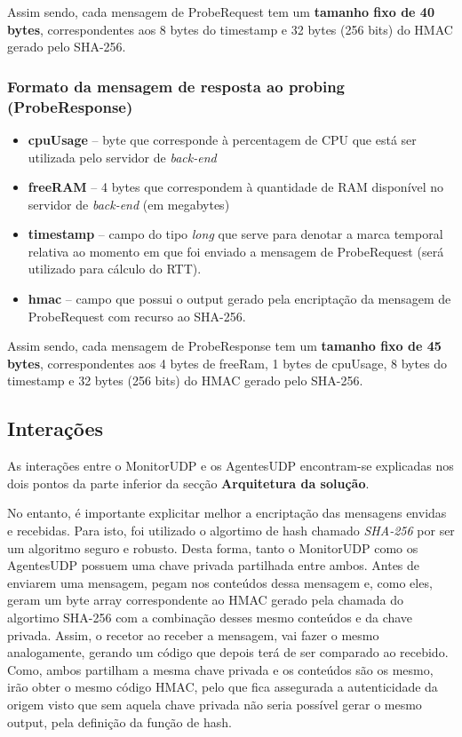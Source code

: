 \documentclass{article}
\begin{document}
Assim sendo, cada mensagem de ProbeRequest tem um \textbf{tamanho fixo de 40 bytes}, correspondentes aos 8 bytes do timestamp e 32 bytes (256 bits) do HMAC gerado pelo SHA-256.

\subsubsection{Formato da mensagem de resposta ao probing (ProbeResponse)}

\begin{itemize}
    \item \textbf{cpuUsage} -- byte que corresponde à percentagem de CPU que está ser utilizada pelo servidor de \emph{back-end}
    \item \textbf{freeRAM} -- 4 bytes que correspondem à quantidade de RAM disponível no servidor de \emph{back-end} (em megabytes)
    \item \textbf{timestamp} -- campo do tipo \emph{long} que serve para denotar a marca temporal relativa ao momento em que foi enviado a mensagem de ProbeRequest (será utilizado para cálculo do RTT).
    \item \textbf{hmac} -- campo que possui o output gerado pela encriptação da mensagem de ProbeRequest com recurso ao SHA-256.
\end{itemize}

Assim sendo, cada mensagem de ProbeResponse tem um \textbf{tamanho fixo de 45 bytes}, correspondentes aos 4 bytes de freeRam, 1 bytes de cpuUsage, 8 bytes do timestamp e 32 bytes (256 bits) do HMAC gerado pelo SHA-256.

\subsection{Interações}

As interações entre o MonitorUDP e os AgentesUDP encontram-se explicadas nos dois pontos da parte inferior da secção \textbf{Arquitetura da solução}.

No entanto, é importante explicitar melhor a encriptação das mensagens envidas e recebidas. Para isto, foi utilizado o algortimo de hash chamado \emph{SHA-256} por ser um algoritmo seguro e robusto. Desta forma, tanto o MonitorUDP como os AgentesUDP possuem uma chave privada partilhada entre ambos. Antes de enviarem uma mensagem, pegam nos conteúdos dessa mensagem e, como eles, geram um byte array correspondente ao HMAC gerado pela chamada do algortimo SHA-256 com a combinação desses mesmo conteúdos e da chave privada. Assim, o recetor ao receber a mensagem, vai fazer o mesmo analogamente, gerando um código que depois terá de ser comparado ao recebido. Como, ambos partilham a mesma chave privada e os conteúdos são os mesmo, irão obter o mesmo código HMAC, pelo que fica assegurada a autenticidade da origem visto que sem aquela chave privada não seria possível gerar o mesmo output, pela definição da função de hash.
\end{document}
